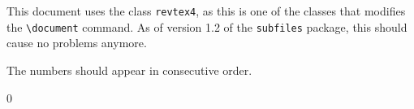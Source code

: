 \documentclass{revtex4}
\begin{document}
This document uses the class \verb|revtex4|, as this is one of the
classes that modifies the \verb|\document| command. As of version 1.2
of the \verb|subfiles| package, this should cause no problems anymore.

The numbers should appear in consecutive order.

0




\end{document}
